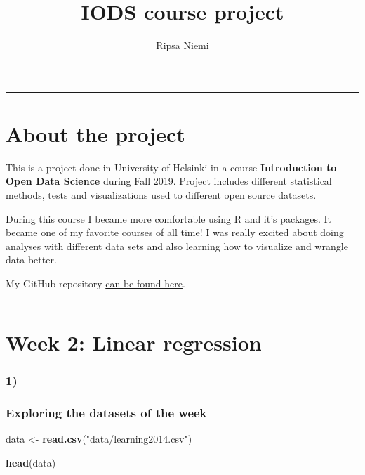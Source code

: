 \documentclass[]{article}
\title{IODS course project}
\author{Ripsa Niemi}
\date{}
\newenvironment{Shaded}{\begin{snugshade}}{\end{snugshade}}
\newcommand{\KeywordTok}[1]{\textcolor[rgb]{0.13,0.29,0.53}{\textbf{#1}}}
\newcommand{\StringTok}[1]{\textcolor[rgb]{0.31,0.60,0.02}{#1}}
\newcommand{\NormalTok}[1]{#1}
\begin{document}
\maketitle

{
\setcounter{tocdepth}{2}
\tableofcontents
}
\begin{center}\rule{0.5\linewidth}{\linethickness}\end{center}

\section{About the project}\label{about-the-project}

This is a project done in University of Helsinki in a course
\textbf{Introduction to Open Data Science} during Fall 2019. Project
includes different statistical methods, tests and visualizations used to
different open source datasets.

During this course I became more comfortable using R and it's packages.
It became one of my favorite courses of all time! I was really excited
about doing analyses with different data sets and also learning how to
visualize and wrangle data better.

My GitHub repository
\href{https://github.com/ripsaniemi/IODS-project}{can be found here}.

\begin{center}\rule{0.5\linewidth}{\linethickness}\end{center}

\section{Week 2: Linear regression}\label{week-2-linear-regression}

\subsubsection{1)}\label{section}

\subsubsection{Exploring the datasets of the
week}\label{exploring-the-datasets-of-the-week}

\begin{Shaded}
\begin{Highlighting}[]
\NormalTok{data <-}\StringTok{ }\KeywordTok{read.csv}\NormalTok{(}\StringTok{"data/learning2014.csv"}\NormalTok{)}

\KeywordTok{head}\NormalTok{(data)}
\end{Highlighting}
\end{Shaded}
\end{document}
